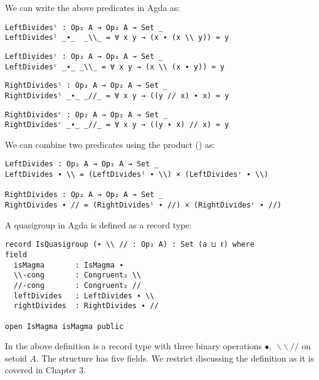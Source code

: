 We can write the above predicates in Agda as:

\begin{verbatim}
LeftDividesˡ : Op₂ A → Op₂ A → Set _
LeftDividesˡ _∙_  _\\_ = ∀ x y → (x ∙ (x \\ y)) ≈ y
\end{verbatim}
\begin{verbatim}
LeftDividesʳ : Op₂ A → Op₂ A → Set _
LeftDividesʳ _∙_ _\\_ = ∀ x y → (x \\ (x ∙ y)) ≈ y
\end{verbatim}
\begin{verbatim}
RightDividesˡ : Op₂ A → Op₂ A → Set _
RightDividesˡ _∙_ _//_ = ∀ x y → ((y // x) ∙ x) ≈ y
\end{verbatim}
\begin{verbatim}
RightDividesʳ : Op₂ A → Op₂ A → Set _
RightDividesʳ _∙_ _//_ = ∀ x y → ((y ∙ x) // x) ≈ y
\end{verbatim}

We can combine two predicates using the product () as:

\begin{verbatim}
LeftDivides : Op₂ A → Op₂ A → Set _
LeftDivides ∙ \\ = (LeftDividesˡ ∙ \\) × (LeftDividesʳ ∙ \\)

RightDivides : Op₂ A → Op₂ A → Set _
RightDivides ∙ // = (RightDividesˡ ∙ //) × (RightDividesʳ ∙ //)
\end{verbatim} 

A quasigroup in Agda is defined as a record type:

\begin{verbatim}
record IsQuasigroup (∙ \\ // : Op₂ A) : Set (a ⊔ ℓ) where
field
  isMagma       : IsMagma ∙
  \\-cong       : Congruent₂ \\
  //-cong       : Congruent₂ //
  leftDivides   : LeftDivides ∙ \\
  rightDivides  : RightDivides ∙ //

open IsMagma isMagma public
\end{verbatim}
In the above definition  is a record type with three binary
operations $∙,\ \backslash\backslash \ //$ on setoid $A$. The structure has five
fields. We restrict discussing the definition as it is covered in Chapter 3.

